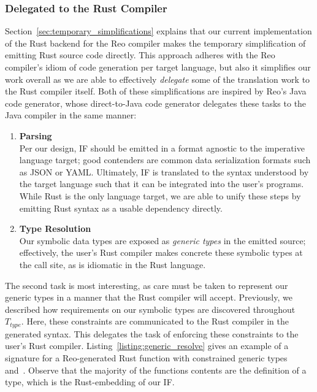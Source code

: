 \subsubsection{Delegated to the Rust Compiler}
Section~\ref{sec:temporary_simplifications} explains that our current implementation of the Rust backend for the Reo compiler makes the temporary simplification of emitting Rust source code directly. This approach adheres with the Reo compiler's idiom of code generation per target language, but also it simplifies our work overall as we are able to effectively \textit{delegate} some of the translation work to the Rust compiler itself. Both of these simplifications are inspired by Reo's Java code generator, whose direct-to-Java code generator delegates these tasks to the Java compiler in the same manner:
\begin{enumerate}
	\item \textbf{Parsing}\\
	Per our design, IF should be emitted in a format agnostic to the imperative language target; good contenders are common data serialization formats such as JSON or YAML. Ultimately, IF is translated to the syntax understood by the target language such that it can be integrated into the user's programs. While Rust is the only language target, we are able to unify these steps by emitting Rust syntax as a usable dependency directly.
	
	\item \textbf{Type Resolution}\\
	Our symbolic data types are exposed as \textit{generic types} in the emitted source; effectively, the user's Rust compiler makes concrete these symbolic types at the call site, as is idiomatic in the Rust language.
\end{enumerate}

The second task is most interesting, as care must be taken to represent our generic types in a manner that the Rust compiler will accept. Previously, we described how requirements on our symbolic types are discovered throughout $T_{type}$. Here, these constraints are communicated to the Rust compiler in the generated syntax. This delegates the task of enforcing these constraints to the user's Rust compiler. Listing~\ref{listing:generic_resolve} gives an example of a signature for a Reo-generated Rust function with constrained generic types~ and~. Observe that the majority of the functions contents are the definition of a~ type, which is the Rust-embedding of our IF. 

